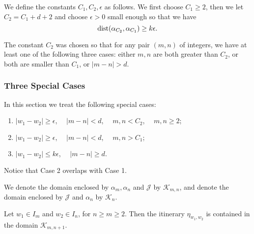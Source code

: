 We define the constants $C_1, C_2, \epsilon$ as follows. We first choose $C_1 \ge 2$, then we let $C_2 = C_1 + d+2$ and choose $\epsilon >0$ small enough so that we have 
\begin{equation}
	\operatorname{dist}(\alpha_{C_2}, \alpha_{C_1}) \geq k \epsilon.
\end{equation}

The constant $C_2$ was chosen so that for any pair $(m,n)$ of integers, we have at least one of the following three cases: either $m,n$ are both greater than $C_2$, or both are smaller than $C_1$, or $|m-n| > d$.

\subsubsection{Three Special Cases}
In this section we treat the following special cases:
\begin{enumerate}
	\item $|w_1-w_2| \geq  \epsilon$, $\quad |m-n|<d$, $\quad m,n < C_2$, $\quad m,n \geq 2$; %
	\item $|w_1-w_2| \geq \epsilon$, $\quad |m-n|<d$, $\quad  m,n> C_1$; %
	\item $|w_1-w_2| \leq k \epsilon$, $\quad |m-n| \geq d$.
\end{enumerate}

Notice that Case 2 overlaps with Case 1.

 We denote the domain enclosed by $\alpha_m, \alpha_n$ and $\mathcal J$ by $\mathcal K_{m,n}$, and denote the domain enclosed by $\mathcal J$ and $\alpha_n$ by $\mathcal K_n$.

\begin{lemma}
Let $w_1 \in I_m$ and $w_2 \in I_n$, for $n \geq m \geq 2$. Then the itinerary $\eta_{w_1,w_2}$ is contained in the domain $\mathcal K_{m,n+1}$.
\end{lemma}


